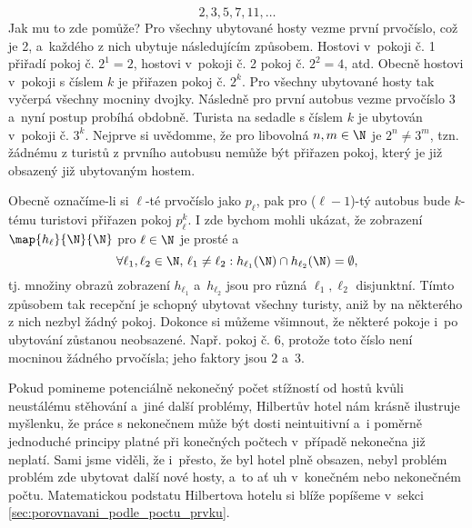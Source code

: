 \begin{enumerate}[label=\textit{(\roman*)}]
    \begin{equation*}
        2,3,5,7,11,\dots
    \end{equation*}
    Jak mu to zde pomůže? Pro všechny ubytované hosty vezme první prvočíslo, což je 2, a~každého z nich ubytuje následujícím způsobem. Hostovi v~pokoji č. 1 přiřadí pokoj č. $2^1=2$, hostovi v~pokoji č. 2 pokoj č. $2^2=4$, atd. Obecně hostovi v~pokoji s číslem $k$ je přiřazen pokoj č. $2^k$. Pro všechny ubytované hosty tak vyčerpá všechny mocniny dvojky. Následně pro první autobus vezme prvočíslo 3 a~nyní postup probíhá obdobně. Turista na sedadle s číslem $k$ je ubytován v~pokoji č. $3^k$. Nejprve si uvědomme, že pro libovolná $n,m\in\N$ je $2^n\neq 3^m$, tzn. žádnému z turistů z prvního autobusu nemůže být přiřazen pokoj, který je již obsazený již ubytovaným hostem.\par
    Obecně označíme-li si $\ell$-té prvočíslo jako $p_\ell$, pak pro ($\ell-1$)-tý autobus bude $k$-tému turistovi přiřazen pokoj $p_\ell^k$. I zde bychom mohli ukázat, že zobrazení $\map{h_\ell}{\N}{\N}$ pro $\ell\in\N$ je prosté a
    \begin{equation*}
        \forall\ell_1,\ell_2\in\N,\,\ell_1\neq\ell_2: h_{\ell_1}(\N)\cap h_{\ell_2}(\N)=\emptyset,
    \end{equation*}
    tj. množiny obrazů zobrazení $h_{\ell_1}$ a~$h_{\ell_2}$ jsou pro různá $\ell_1,\ell_2$ disjunktní. Tímto způsobem tak recepční je schopný ubytovat všechny turisty, aniž by na některého z nich nezbyl žádný pokoj. Dokonce si můžeme všimnout, že některé pokoje i~po ubytování zůstanou neobsazené. Např. pokoj č. 6, protože toto číslo není mocninou žádného prvočísla; jeho faktory jsou $2$ a~$3$.
\end{enumerate}
Pokud pomineme potenciálně nekonečný počet stížností od hostů kvůli neustálému stěhování a~jiné další problémy, Hilbertův hotel nám krásně ilustruje myšlenku, že práce s nekonečnem může být dosti neintuitivní a~i poměrně jednoduché principy platné při konečných počtech v~případě nekonečna již neplatí. Sami jsme viděli, že i~přesto, že byl hotel plně obsazen, nebyl problém problém zde ubytovat další nové hosty, a~to ať uh v~konečném nebo nekonečném počtu. Matematickou podstatu Hilbertova hotelu si blíže popíšeme v~sekci \ref{sec:porovnavani_podle_poctu_prvku}.